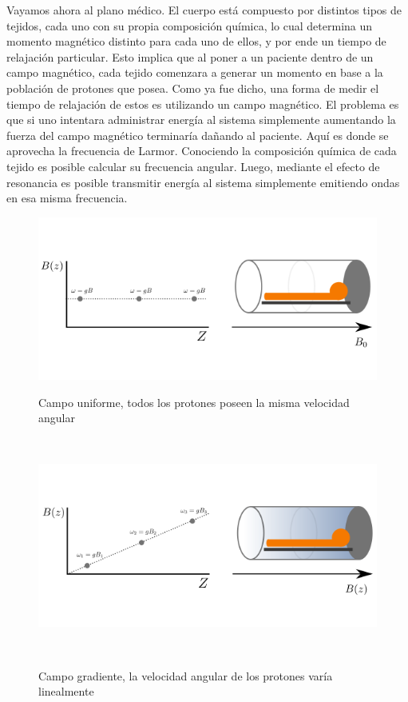 \vspace{0.1cm}
Vayamos ahora al plano m\'edico. El cuerpo est\'a compuesto por distintos 
tipos de tejidos, cada uno con su propia composici\'on qu\'imica, lo cual 
determina un momento magn\'etico distinto para cada uno de ellos, y por ende
un tiempo de relajaci\'on particular. Esto implica que al poner a un paciente
dentro de un campo magn\'etico, cada tejido comenzara a generar un momento 
en base a la poblaci\'on de protones que posea. Como ya fue dicho, una forma de
medir el tiempo de relajaci\'on de estos es utilizando un campo magn\'etico. 
El problema es que si uno intentara administrar energ\'ia al sistema simplemente
aumentando la fuerza del campo magn\'etico terminar\'ia da\~nando al paciente. 
Aqu\'i es donde se aprovecha la frecuencia de Larmor. Conociendo la composici\'on
qu\'imica de cada tejido es posible calcular su frecuencia angular. Luego, 
mediante el efecto de resonancia es posible transmitir energ\'ia al sistema
simplemente emitiendo ondas en esa misma frecuencia. \\

\begin{figure}[h!]
                                                                                                                        
\begin{minipage}[b]{0.49\textwidth}
    \includegraphics[width=\textwidth]{img/grad0.png}
    \caption{\small  Campo uniforme, todos los protones poseen la misma velocidad angular}
     \label{fig:unif}
\end{minipage} ~
\hfill
\begin{minipage}[b]{0.49\textwidth}
    \includegraphics[width=\textwidth]{img/grad1.png}
    \caption{\small Campo gradiente, la velocidad angular de los protones var\'ia linealmente }
    \label{fig:grad}
\end{minipage} ~

\end{figure}  

